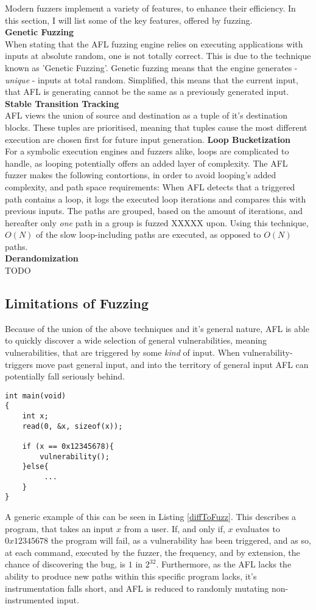 \documentclass[a4paper]{article}
\newcommand{\tbf}[1]{\textbf{#1}}
\newcommand{\tit}[1]{\textit{#1}}
\begin{document}
Modern fuzzers implement a variety of features, to enhance their efficiency. In this section, I will list some of the key features, offered by fuzzing.\\
\tbf{Genetic Fuzzing}\\
When stating that the AFL fuzzing engine relies on executing applications with inputs at absolute random, one is not totally correct. This is due to the technique known as 'Genetic Fuzzing'. Genetic fuzzing means that the engine generates - \tit{unique} - inputs at total random. Simplified, this means that the current input, that AFL is generating cannot be the same as a previously generated input.  
\tbf{Stable Transition Tracking}\\
AFL views the union of source and destination as a tuple of it's destination blocks.  These tuples are prioritised, meaning that tuples cause the most different execution are chosen first for future input generation.
\tbf{Loop Bucketization}\\
For a symbolic execution engines and fuzzers alike, loops are complicated to handle, as looping potentially offers an added layer of complexity. The AFL fuzzer makes the following contortions, in order to avoid looping's added complexity, and path space requirements:
When AFL detects that a triggered path contains a loop, it logs the executed loop iterations and compares this with previous inputs. The paths are grouped, based on the amount of iterations, and hereafter only \tit{one} path in a group is fuzzed XXXXX upon. Using this technique, $O(N)$ of the slow loop-including paths are executed, as opposed to $O(N)$ paths.\\
\tbf{Derandomization}\\
 TODO
\newpage
\subsection{Limitations of Fuzzing}
Because of the union of the above techniques and it's general nature, AFL is able to quickly discover a wide selection of general vulnerabilities, meaning vulnerabilities, that are triggered by some \tit{kind} of input. When vulnerability-triggers move past general input, and into the territory of general input AFL can potentially fall seriously behind.
\begin{lstlisting}[caption=A program that is difficult to fuzz, label=diffToFuzz, captionpos=b]
int main(void)
{
    int x;
    read(0, &x, sizeof(x));
    
    if (x == 0x12345678){
        vulnerability();
    }else{
         ...
    }
}
\end{lstlisting}
A generic example of this can be seen in Listing \ref{diffToFuzz}. This describes a program, that takes an input $x$ from a user. If, and only if, $x$ evaluates to $0x12345678$ the program will fail, as a vulnerability has been triggered, and as so, at each command, executed by the fuzzer, the frequency, and by extension, the chance of discovering the bug, is $1$ in $2^{32}$. Furthermore, as the AFL lacks the ability to produce new paths within this specific program lacks, it's instrumentation falls short, and AFL is reduced to randomly mutating non-instrumented input.
\end{document}
